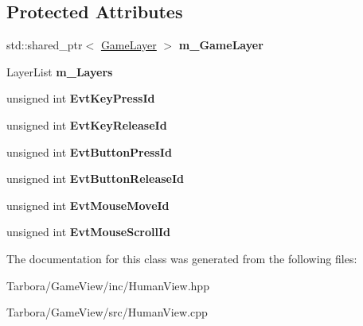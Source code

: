 \subsection*{Protected Attributes}
\begin{DoxyCompactItemize}
\item 
\mbox{\label{classTarbora_1_1HumanView_a3f61b24596499e6249136efd22a2b818}} 
std\+::shared\+\_\+ptr$<$ \hyperlink{classTarbora_1_1GameLayer}{Game\+Layer} $>$ {\bfseries m\+\_\+\+Game\+Layer}
\item 
\mbox{\label{classTarbora_1_1HumanView_a09f3664c6d9e79bc83054fd3df4bfa2e}} 
Layer\+List {\bfseries m\+\_\+\+Layers}
\item 
\mbox{\label{classTarbora_1_1HumanView_a1f31d17eebef84fd84ef6ff1d38b1c12}} 
unsigned int {\bfseries Evt\+Key\+Press\+Id}
\item 
\mbox{\label{classTarbora_1_1HumanView_ad2ddebb6ba7685ea70fc5982bd81c04a}} 
unsigned int {\bfseries Evt\+Key\+Release\+Id}
\item 
\mbox{\label{classTarbora_1_1HumanView_a428fde63f13aa68167d54afea96e77fe}} 
unsigned int {\bfseries Evt\+Button\+Press\+Id}
\item 
\mbox{\label{classTarbora_1_1HumanView_a0277cc15f329ce840c431ee079ec06be}} 
unsigned int {\bfseries Evt\+Button\+Release\+Id}
\item 
\mbox{\label{classTarbora_1_1HumanView_ae0c4f8670e4a27c1699b94a281b58bbf}} 
unsigned int {\bfseries Evt\+Mouse\+Move\+Id}
\item 
\mbox{\label{classTarbora_1_1HumanView_aa870c7ef3d3bccaba17d160c45eadbdc}} 
unsigned int {\bfseries Evt\+Mouse\+Scroll\+Id}
\end{DoxyCompactItemize}


The documentation for this class was generated from the following files\+:\begin{DoxyCompactItemize}
\item 
Tarbora/\+Game\+View/inc/Human\+View.\+hpp\item 
Tarbora/\+Game\+View/src/Human\+View.\+cpp\end{DoxyCompactItemize}
